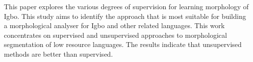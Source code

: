 This paper explores the various degrees of supervision for learning morphology of Igbo. This study aims to identify the approach that is most suitable for building a morphological analyser for Igbo and other related languages. This work concentrates on supervised and unsupervised approaches to morphological segmentation of low resource languages. The results indicate that unsupervised methods are better than supervised.
